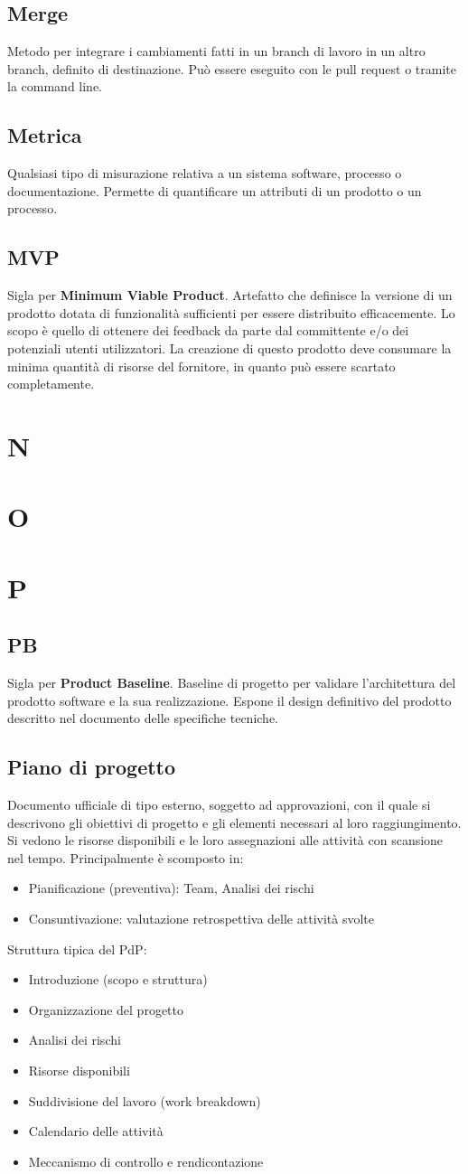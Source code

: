 \documentclass[a4paper,12pt]{article}
\newcommand{\termdefinition}[1]{\subsection*{#1}\index{#1}} %
\begin{document}
\termdefinition{Merge}
Metodo per integrare i cambiamenti fatti in un branch di lavoro in un altro branch, definito di destinazione. Può essere eseguito con le pull request o tramite la command line.

\termdefinition{Metrica}
Qualsiasi tipo di misurazione relativa a un sistema software, processo o documentazione. Permette di quantificare un attributi di un prodotto o un processo.

\termdefinition{MVP}
Sigla per \textbf{Minimum Viable Product}. Artefatto che definisce la versione di un prodotto dotata di funzionalità sufficienti per essere distribuito efficacemente.
Lo scopo è quello di ottenere dei feedback da parte dal committente e/o dei potenziali utenti utilizzatori.
La creazione di questo prodotto deve consumare la minima quantità di risorse del fornitore, in quanto può essere scartato completamente.

\clearpage

\section{N}

\section{O}

\section{P}

\termdefinition{PB}
Sigla per \textbf{Product Baseline}. Baseline di progetto per validare l'architettura del prodotto software e la sua realizzazione. Espone il design definitivo del prodotto descritto nel documento delle specifiche tecniche.

\termdefinition{Piano di progetto}
Documento ufficiale di tipo esterno, soggetto ad approvazioni, con il quale si descrivono gli obiettivi di progetto e gli elementi necessari al loro raggiungimento.  
Si vedono le risorse disponibili e le loro assegnazioni alle attività con scansione nel tempo.  
Principalmente è scomposto in:
\begin{itemize}
\item Pianificazione (preventiva): Team, Analisi dei rischi
\item Consuntivazione: valutazione retrospettiva delle attività svolte
\end{itemize}
Struttura tipica del PdP:
\begin{itemize}
\item Introduzione (scopo e struttura)
\item Organizzazione del progetto
\item Analisi dei rischi
\item Risorse disponibili
\item Suddivisione del lavoro (work breakdown)
\item Calendario delle attività
\item Meccanismo di controllo e rendicontazione
\end{itemize}
\end{document}

